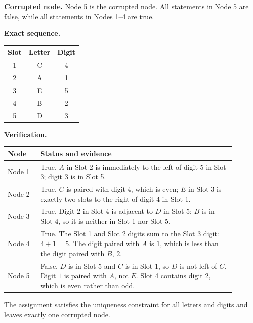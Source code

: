\documentclass{llmxive}
\begin{document}
\begin{caseresponse}
\textbf{Corrupted node.} Node 5 is the corrupted node. All statements in Node 5 are false, while all statements in Nodes 1--4 are true.

\textbf{Exact sequence.}
\begin{center}
\begin{tabular}{ccc}
\toprule
\textbf{Slot} & \textbf{Letter} & \textbf{Digit} \\
\midrule
1 & C & 4 \\
2 & A & 1 \\
3 & E & 5 \\
4 & B & 2 \\
5 & D & 3 \\
\bottomrule
\end{tabular}
\end{center}

\textbf{Verification.}
\begin{center}
\begin{tabular}{p{0.13\linewidth}p{0.77\linewidth}}
\toprule
\textbf{Node} & \textbf{Status and evidence} \\
\midrule
Node 1 & True. \(A\) in Slot 2 is immediately to the left of digit \(5\) in Slot 3; digit \(3\) is in Slot 5. \\
Node 2 & True. \(C\) is paired with digit \(4\), which is even; \(E\) in Slot 3 is exactly two slots to the right of digit \(4\) in Slot 1. \\
Node 3 & True. Digit \(2\) in Slot 4 is adjacent to \(D\) in Slot 5; \(B\) is in Slot 4, so it is neither in Slot 1 nor Slot 5. \\
Node 4 & True. The Slot 1 and Slot 2 digits sum to the Slot 3 digit: \(4+1=5\). The digit paired with \(A\) is \(1\), which is less than the digit paired with \(B\), \(2\). \\
Node 5 & False. \(D\) is in Slot 5 and \(C\) is in Slot 1, so \(D\) is not left of \(C\). Digit \(1\) is paired with \(A\), not \(E\). Slot 4 contains digit \(2\), which is even rather than odd. \\
\bottomrule
\end{tabular}
\end{center}

The assignment satisfies the uniqueness constraint for all letters and digits and leaves exactly one corrupted node.
\end{caseresponse}

\label{fig:corrupted_ai_protocol_case}
\end{document}
